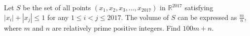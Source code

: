 Let $S$ be the set of all points $(x_1, x_2, x_3, \dots, x_{2017})$ in $\mathbb{R}^{2017}$ satisfying $|x_i|+|x_j|\leq 1$ for any $1\leq i<  j\leq 2017$. The volume of $S$ can be expressed as $\frac{m}{n}$, where $m$ and $n$ are relatively prime positive integers. Find $100m+n$.
